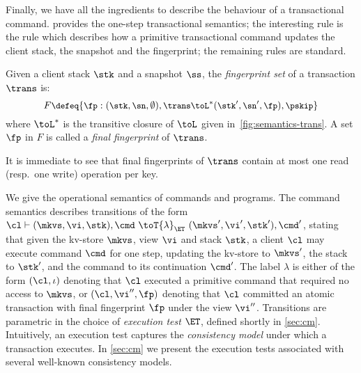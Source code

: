 Finally, we have all the ingredients to describe the behaviour of a transactional command.   provides the one-step transactional semantics; 
the interesting rule is the  rule which describes how a primitive transactional command updates the client stack, the snapshot and the fingerprint; 
the remaining rules are standard.



\begin{definition}
Given a client stack $\stk$ and a snapshot $\ss$, the \emph{fingerprint set} of a transaction $\trans$ is:
%
{
\[
\small
F \defeq \{\fp : (\stk, \sn, \emptyset), \trans \toL^* (\stk', \sn', \fp), \pskip \}
\]%
}%
%
where $\toL^*$ is the transitive closure of $\toL$ given in~\cref{fig:semantics-trans}.  
A set $\fp$ in $F$ is called a \emph{final fingerprint} of $\trans$. 
\end{definition}
\noindent It is immediate to see that final fingerprints of $\trans$ contain at most one read (resp.\ one write) operation per key.

We give the operational semantics of commands and programs. 
The command semantics describes transitions of the form
$\cl \vdash (\mkvs, \vi, \stk), \cmd \ \toT{\lambda}_{\ET} \ (\mkvs', \vi', \stk') ,
\cmd'$, stating that given the kv-store $\mkvs$, view $\vi$ and stack $\stk$, 
a client $\cl$ may execute command $\cmd$ for one step, updating 
the kv-store to $\mkvs'$, the stack to $\stk'$, and the command to its continuation $\cmd'$.
The label $\lambda$ is either of the form $(\cl, \iota)$ denoting that $\cl$ executed a primitive command
that required no access to $\mkvs$, 
or $(\cl, \vi'', \fp)$ denoting that $\cl$ committed an atomic transaction with final fingerprint $\fp$ under the view $\vi''$.
Transitions are parametric in the choice of \emph{execution test} $\ET$, defined shortly in \cref{sec:cm}.
Intuitively, an execution test captures the \emph{consistency model} under which a transaction executes.
In \cref{sec:cm} we present the execution tests associated with several well-known consistency models.  %

